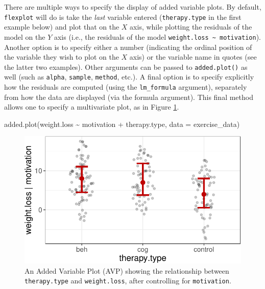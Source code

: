 \documentclass[
  english,
  man]{apa6}
\newenvironment{Shaded}{\begin{snugshade}}{\end{snugshade}}
\newcommand{\AttributeTok}[1]{\textcolor[rgb]{0.77,0.63,0.00}{#1}}
\newcommand{\FunctionTok}[1]{\textcolor[rgb]{0.00,0.00,0.00}{#1}}
\newcommand{\NormalTok}[1]{#1}
\newcommand{\SpecialCharTok}[1]{\textcolor[rgb]{0.00,0.00,0.00}{#1}}
\begin{document}
There are multiple ways to specify the display of added variable plots. By default, \texttt{flexplot} will do is take the \emph{last} variable entered (\texttt{therapy.type} in the first example below) and plot that on the \(X\) axis, while plotting the residuals of the model on the \(Y\) axis (i.e., the residuals of the model \texttt{weight.loss\ \textasciitilde{}\ motivation}). Another option is to specify either a number (indicating the ordinal position of the variable they wish to plot on the \(X\) axis) or the variable name in quotes (see the latter two examples). Other arguments can be passed to \texttt{added.plot()} as well (such as \texttt{alpha}, \texttt{sample}, \texttt{method}, etc.). A final option is to specify explicitly how the residuals are computed (using the \texttt{lm\_formula} argument), separately from how the data are displayed (via the formula argument). This final method allows one to specify a multivariate plot, as in Figure \ref{fig:avp}.

\small

\begin{Shaded}
\begin{Highlighting}[]
\FunctionTok{added.plot}\NormalTok{(weight.loss }\SpecialCharTok{\textasciitilde{}}\NormalTok{ motivation }\SpecialCharTok{+}\NormalTok{ therapy.type, }\AttributeTok{data =}\NormalTok{ exercise\_data)}
\end{Highlighting}
\end{Shaded}

\begin{figure}
\centering
\includegraphics{flexplot_psychmeth_files/figure-latex/avp-1.pdf}
\caption{\label{fig:avp-1}An Added Variable Plot (AVP) showing the relationship between \texttt{therapy.type} and \texttt{weight.loss}, after controlling for \texttt{motivation}. \label{fig:avp}}
\end{figure}
\end{document}
